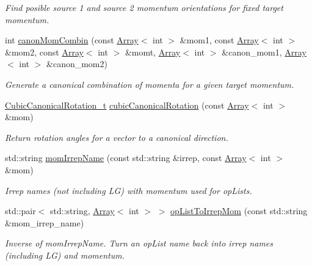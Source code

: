 \begin{DoxyCompactItemize}
\begin{DoxyCompactList}\small\item\em Find posible source 1 and source 2 momentum orientations for fixed target momentum. \end{DoxyCompactList}\item 
int \mbox{\hyperlink{namespaceHadron_ab874ef7e96f2c243de41a6ef639bf3c3}{canon\+Mom\+Combin}} (const \mbox{\hyperlink{classXMLArray_1_1Array}{Array}}$<$ int $>$ \&mom1, const \mbox{\hyperlink{classXMLArray_1_1Array}{Array}}$<$ int $>$ \&mom2, const \mbox{\hyperlink{classXMLArray_1_1Array}{Array}}$<$ int $>$ \&momt, \mbox{\hyperlink{classXMLArray_1_1Array}{Array}}$<$ int $>$ \&canon\+\_\+mom1, \mbox{\hyperlink{classXMLArray_1_1Array}{Array}}$<$ int $>$ \&canon\+\_\+mom2)
\begin{DoxyCompactList}\small\item\em Generate a canonical combination of momenta for a given target momentum. \end{DoxyCompactList}\item 
\mbox{\hyperlink{structHadron_1_1CubicCanonicalRotation__t}{Cubic\+Canonical\+Rotation\+\_\+t}} \mbox{\hyperlink{namespaceHadron_ada689173e1553ad2f452af24028eae2f}{cubic\+Canonical\+Rotation}} (const \mbox{\hyperlink{classXMLArray_1_1Array}{Array}}$<$ int $>$ \&mom)
\begin{DoxyCompactList}\small\item\em Return rotation angles for a vector to a canonical direction. \end{DoxyCompactList}\item 
std\+::string \mbox{\hyperlink{namespaceHadron_a5c4cac841f1c5a1f144e6c98360d8a4d}{mom\+Irrep\+Name}} (const std\+::string \&irrep, const \mbox{\hyperlink{classXMLArray_1_1Array}{Array}}$<$ int $>$ \&mom)
\begin{DoxyCompactList}\small\item\em Irrep names (not including LG) with momentum used for op\+Lists. \end{DoxyCompactList}\item 
std\+::pair$<$ std\+::string, \mbox{\hyperlink{classXMLArray_1_1Array}{Array}}$<$ int $>$ $>$ \mbox{\hyperlink{namespaceHadron_a8bd515c92e3dbbe8e9741b25d71edc60}{op\+List\+To\+Irrep\+Mom}} (const std\+::string \&mom\+\_\+irrep\+\_\+name)
\begin{DoxyCompactList}\small\item\em Inverse of mom\+Irrep\+Name. Turn an op\+List name back into irrep names (including LG) and momentum. \end{DoxyCompactList}\item 

\end{DoxyCompactItemize}
